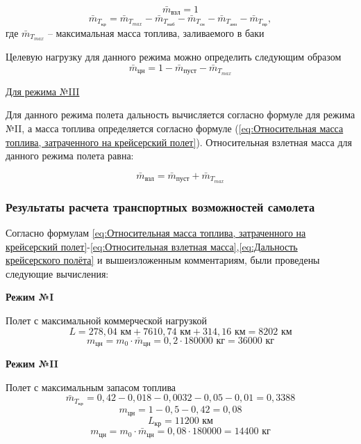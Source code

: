 $$\bar{m}_\text{взл} = 1$$
\begin{equation}
    \label{eq:Относительная масса топлива, затраченного на крейсерский полет}
    \bar{m}_{T_\text{кр}} = \bar{m}_{T_{max}} - \bar{m}_{T_\text{наб}} -\bar{m}_{T_\text{сн}} -\bar{m}_{T_\text{анз}} - \bar{m}_{T_\text{пр}},
\end{equation}
где $\bar{m}_{T_{max}}$ -- максимальная масса топлива, заливаемого в баки

Целевую нагрузку для данного режима можно определить следующим образом
\begin{equation}
    \label{eq:Целевая нагрузка}
    \bar{m}_\text{цн} = 1 - \bar{m}_\text{пуст} - \bar{m}_{T_{max}}
\end{equation}

\underline{Для режима №III}

Для данного режима полета дальность вычисляется согласно формуле для режима №II, а масса топлива определяется согласно формуле (\ref{eq:Относительная масса топлива, затраченного на крейсерский полет}). Относительная взлетная масса для данного режима полета равна:

\begin{equation}
    \label{eq:Относительная взлетная масса}
    \bar{m}_\text{взл} = \bar{m}_\text{пуст} + \bar{m}_{T_{max}} 
\end{equation}

\subsubsection{Результаты расчета транспортных возможностей самолета}
\label{sec:Результаты расчета транспортных возможностей самолета}

Согласно формулам \ref{eq:Относительная масса топлива, затраченного на крейсерский полет}-\ref{eq:Относительная взлетная масса},\ref{eq:Дальность крейсерского полёта} и вышеизложенным комментариям, были
проведены следующие вычисления:

\textbf{Режим №I}

Полет с максимальной коммерческой нагрузкой 
$$L = 278,04 \text{ км} + 7610,74 \text{ км} + 314,16\text{ км} = 8202\text{ км}$$
$$m_\text{цн} = m_0 \cdot \bar{m}_\text{цн} = 0,2 \cdot 180000 \text{ кг}= 36 000 \text{ кг}$$ 

\textbf{Режим №II}

Полет с максимальным запасом топлива 
$$\bar{m}_{T_\text{кр}} = 0,42 - 0,018 - 0,0032 - 0,05 - 0,01 = 0,3388$$
$$m_\text{цн} = 1 - 0,5 - 0,42 = 0,08$$
$$L_\text{кр} = 11200\text{ км}$$
$$m_\text{цн} = m_0 \cdot \bar{m}_\text{цн} = 0,08 \cdot 180000 = 14400 \text{ кг}$$

